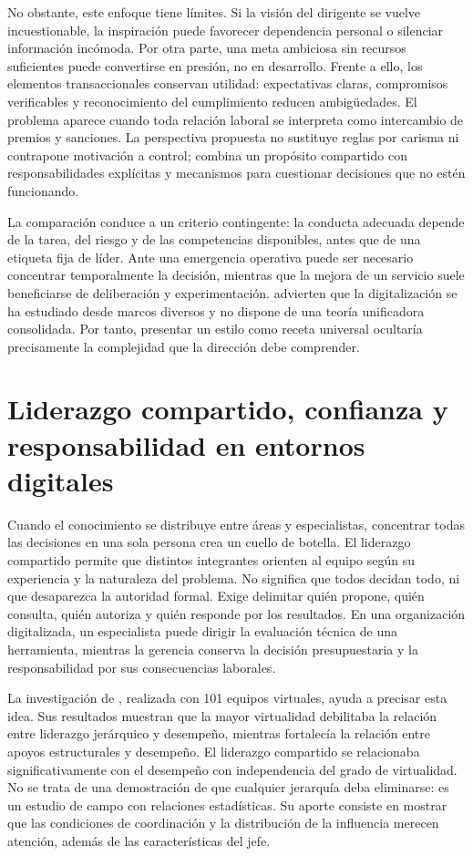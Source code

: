 \documentclass[12pt,letterpaper,oneside]{article}
\begin{document}
No obstante, este enfoque tiene límites. Si la visión del dirigente se vuelve incuestionable, la inspiración puede favorecer dependencia personal o silenciar información incómoda. Por otra parte, una meta ambiciosa sin recursos suficientes puede convertirse en presión, no en desarrollo. Frente a ello, los elementos transaccionales conservan utilidad: expectativas claras, compromisos verificables y reconocimiento del cumplimiento reducen ambigüedades. El problema aparece cuando toda relación laboral se interpreta como intercambio de premios y sanciones. La perspectiva propuesta no sustituye reglas por carisma ni contrapone motivación a control; combina un propósito compartido con responsabilidades explícitas y mecanismos para cuestionar decisiones que no estén funcionando.

La comparación conduce a un criterio contingente: la conducta adecuada depende de la tarea, del riesgo y de las competencias disponibles, antes que de una etiqueta fija de líder. Ante una emergencia operativa puede ser necesario concentrar temporalmente la decisión, mientras que la mejora de un servicio suele beneficiarse de deliberación y experimentación. \textcite{cortellazzo2019} advierten que la digitalización se ha estudiado desde marcos diversos y no dispone de una teoría unificadora consolidada. Por tanto, presentar un estilo como receta universal ocultaría precisamente la complejidad que la dirección debe comprender.

\section*{Liderazgo compartido, confianza y responsabilidad en entornos digitales}

Cuando el conocimiento se distribuye entre áreas y especialistas, concentrar todas las decisiones en una sola persona crea un cuello de botella. El liderazgo compartido permite que distintos integrantes orienten al equipo según su experiencia y la naturaleza del problema. No significa que todos decidan todo, ni que desaparezca la autoridad formal. Exige delimitar quién propone, quién consulta, quién autoriza y quién responde por los resultados. En una organización digitalizada, un especialista puede dirigir la evaluación técnica de una herramienta, mientras la gerencia conserva la decisión presupuestaria y la responsabilidad por sus consecuencias laborales.

La investigación de \textcite{hoch2014}, realizada con 101 equipos virtuales, ayuda a precisar esta idea. Sus resultados muestran que la mayor virtualidad debilitaba la relación entre liderazgo jerárquico y desempeño, mientras fortalecía la relación entre apoyos estructurales y desempeño. El liderazgo compartido se relacionaba significativamente con el desempeño con independencia del grado de virtualidad. No se trata de una demostración de que cualquier jerarquía deba eliminarse: es un estudio de campo con relaciones estadísticas. Su aporte consiste en mostrar que las condiciones de coordinación y la distribución de la influencia merecen atención, además de las características del jefe.
\end{document}
